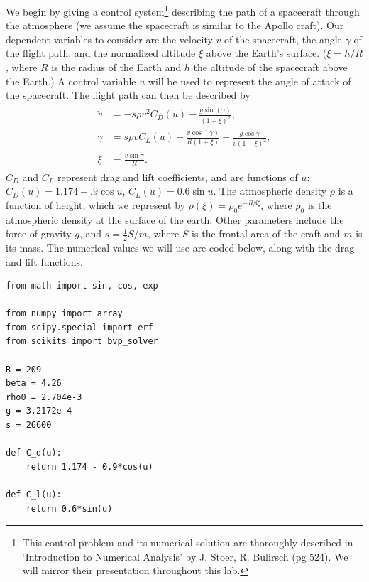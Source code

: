 We begin by giving a control system\footnote{This control problem and its numerical solution are thoroughly described in `Introduction to Numerical Analysis' by J. Stoer, R. Bulirsch (pg 524). 
We will mirror their presentation throughout this lab.}
describing the path of a spacecraft through the atmosphere 
(we assume the spacecraft is similar to the Apollo craft).
Our dependent variables to consider are the velocity $v$ of the spacecraft,  the angle $\gamma$ of the flight path, and the normalized altitude $\xi$ above the Earth's surface. ($\xi = h/R$, where $R$ is the radius of the Earth and $h$ the altitude of the spacecraft above the Earth.) 
A control variable  $u$ will be used to represent the angle of attack of the spacecraft. 
The flight path can then be described by 
\begin{align}
\begin{split}
\dot{v} &= -s\rho v^2C_D(u) - \frac{g\sin(\gamma)}{(1+\xi)^2},\\
\dot{\gamma} &= s \rho v C_L(u) + \frac{v \cos(\gamma)}{R(1+\xi)} - \frac{g \cos \gamma}{v(1+\xi)^2},\\
\dot{\xi} &= \frac{v \sin \gamma}{R}.
\end{split} \label{eqn:reentry:control_system}
\end{align}
$C_D$ and $C_L$ represent drag and lift coefficients, and are functions of $u$: $C_D(u) = 1.174 - .9\cos u$, $C_L(u) = 0.6\sin u$. 
The atmospheric density $\rho$ is a function of height, which we represent by $\rho(\xi) = \rho_0e^{-R\beta\xi}$, where  $\rho_0$ is the atmospheric density at the surface of the earth. 
Other parameters include the force of gravity $g$, and $s = \frac{1}{2}S/m$, where $S$ is the frontal area of the craft and $m$ is its mass.
The numerical values we will use are coded below, along with the drag and lift functions. 
\begin{lstlisting}
from math import sin, cos, exp

from numpy import array
from scipy.special import erf
from scikits import bvp_solver

R = 209
beta = 4.26
rho0 = 2.704e-3
g = 3.2172e-4
s = 26600 

def C_d(u): 
	return 1.174 - 0.9*cos(u)

def C_l(u): 
	return 0.6*sin(u)
\end{lstlisting}

